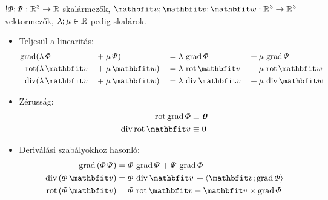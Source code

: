 \begin{blueBox}[][nobreak]
  $! \varPhi; \varPsi : \mathbb{R}^3 \rightarrow \mathbb{R}$ skalármezők,
  $\rvec u; \rvec v; \rvec w : \Reals^3 \rightarrow \Reals^3$
  vektormezők, $\lambda; \mu \in \mathbb{R}$ pedig skalárok.
  \begin{itemize}
    \item Teljesül a linearitás:
          \vspace{-.5em}
          \begin{alignat*}{4}
            \grad & (\lambda \, \varPhi && + \mu \, \varPsi) && = \lambda \, \grad \varPhi && + \mu \, \grad \varPsi
            \\
            \rot  & (\lambda \, \rvec v && + \mu \, \rvec w) && = \lambda \, \rot \rvec v  && + \mu \, \rot \rvec w
            \\
            \Div  & (\lambda \, \rvec v && + \mu \, \rvec w) && = \lambda \, \Div \rvec v  && + \mu \, \Div \rvec w
          \end{alignat*}

    \item Zérusság:
          \vspace{-.5em}
          \begin{alignat*}{1}
            \rot \grad \varPhi & \equiv \nvec
            \\
            \Div \rot \rvec v  & \equiv 0
          \end{alignat*}

    \item Deriválási szabályokhoz hasonló:
          \vspace{-.5em}
          \begin{align*}
            \grad \left( \varPhi \, \varPsi \right)
             & = \varPhi \, \grad \varPsi
            + \varPsi \, \grad \varPhi
            \\
            \Div \left( \varPhi \, \rvec v \right)
             & = \varPhi \, \Div \rvec v \,
            + \scalar{\rvec v}{\grad \varPhi}
            \\
            \rot \left( \varPhi \, \rvec v \right)
             & = \varPhi \, \rot \rvec v
            - \rvec v \times \grad \varPhi
          \end{align*}


\end{itemize}
\end{blueBox}
